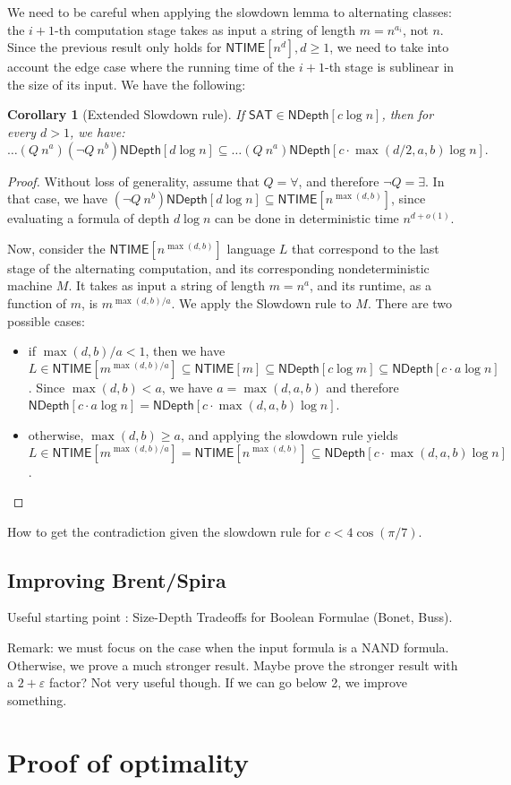 \documentclass[a4paper, 11pt]{article}
\theoremstyle{plain}
\newtheorem{corollary}[theorem]{Corollary}
\theoremstyle{definition}
\theoremstyle{remark}
\newcommand{\eps}{\varepsilon}%
\newcommand{\NTIME}{\textsf{NTIME}}%
\newcommand{\SAT}{\textsf{SAT}}%
\newcommand{\NAND}{\textsf{NAND}}%
\newcommand{\ND}{\textsf{NDepth}}%
\newcommand{\NDL}[1]{\ND[ #1 \log n]}%
\begin{document}
We need to be careful when applying the slowdown lemma to alternating classes:
the $i+1$-th computation stage takes as input a string of length $m = n^{a_i}$, not $n$.
Since the previous result only holds for $\NTIME[n^d], d \ge 1$, 
we need to take into
account the edge case where the running time of the $i+1$-th
stage is sublinear in the size of its input.
We have the following:
\begin{corollary}[Extended Slowdown rule]
	If $\SAT{}\in \NDL{c}$, then for every $d > 1$, we have:
	\[\ldots (Q~n^{a}) (\neg Q~n^b) \NDL{d}
	\subseteq \ldots (Q~n^{a}) \NDL{c\cdot\max(d/2, a, b)}.\]
\end{corollary}
\begin{proof}
	Without loss of generality, assume that $Q = \forall$, and therefore $\neg Q = \exists$.
	In that case, we have $(\neg Q~n^b) \NDL{d} \subseteq \NTIME[n^{\max(d, b)}]$,
	since evaluating a formula of depth $d \log n$ can be done in deterministic time
	$n^{d + o(1)}$.

	Now, consider the $\NTIME[n^{\max(d, b)}]$ language $L$ that correspond to the last stage of the alternating 
	computation, and its corresponding nondeterministic machine $M$. 
	It takes as input a string of length $m = n^{a}$, and its runtime, as a function of $m$, 
	is $m^{\max(d, b)/a}$.
	We apply the Slowdown rule to $M$. There are two possible cases:
	\begin{itemize}
		\item if $\max(d, b)/a < 1$, then we have $L \in \NTIME[m^{\max(d, b)/a}] \subseteq \NTIME[m]
		\subseteq \ND[c \log m] \subseteq \NDL{c \cdot a}$.
		Since  $\max(d, b) < a$, we have $a = \max(d, a, b)$ and therefore 
		$\NDL{c \cdot a} = \NDL{c\cdot\max(d, a, b)}$.
		\item otherwise, $\max(d, b) \ge a$, and applying the slowdown rule yields
		$L \in \NTIME[m^{\max(d, b)/a}] =  \NTIME[n^{\max(d, b)}] \subseteq \NDL{c \cdot \max(d, a, b)}$.
	\end{itemize}
\end{proof}


How to get the contradiction given the slowdown rule for $c < 4\cos(\pi /7)$.

\subsection{Improving Brent/Spira}
Useful starting point : Size-Depth Tradeoffs for Boolean Formulae (Bonet, Buss).

Remark: we must focus on the case when the input formula is a \NAND{} formula.
Otherwise, we prove a much stronger result.
Maybe prove the stronger result with a $2+\eps$ factor? Not very useful though.
If we can go below 2, we improve something.
\section{Proof of optimality}




\end{document}
